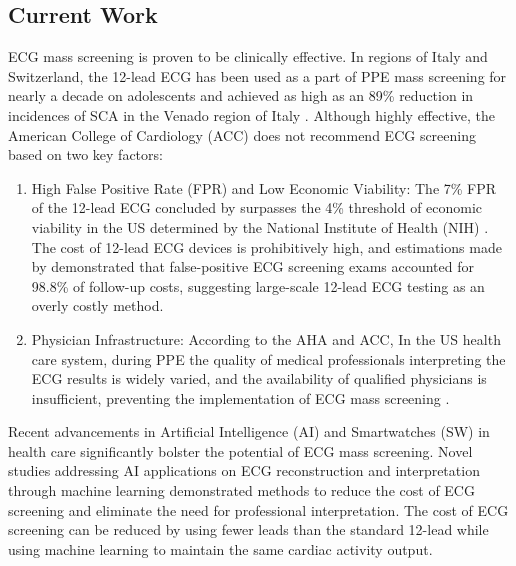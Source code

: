 \documentclass[
	a4paper, 
	10pt, 
	twoside, 
]{LTJournalArticle}
\begin{document}
\subsection{Current Work}
ECG mass screening is proven to be clinically effective. In regions of Italy and Switzerland, the 12-lead ECG has been used as a part of PPE mass screening for nearly a decade on adolescents and achieved as high as an 89\% reduction in incidences of SCA in the Venado region of Italy \cite{Albiski2022}. Although highly effective, the American College of Cardiology (ACC) does not recommend ECG screening based on two key factors:
\begin{enumerate}
    \item High False Positive Rate (FPR) and Low Economic Viability: The 7\% FPR of the 12-lead ECG concluded by \textcite{Harmon2015} surpasses the 4\% threshold of economic viability in the US determined by the National Institute of Health (NIH) \cite{Wheeler2010}. The cost of 12-lead ECG devices is prohibitively high, and estimations made by \textcite{OConnor2010} demonstrated that false-positive ECG screening exams accounted for 98.8\% of follow-up costs, suggesting large-scale 12-lead ECG testing as an overly costly method.
	\item Physician Infrastructure: According to the AHA and ACC, In the US health care system, during PPE the quality of medical professionals interpreting the ECG results is widely varied, and the availability of qualified physicians is insufficient, preventing the implementation of ECG mass screening \cite{Maron2014}.
\end{enumerate}
Recent advancements in Artificial Intelligence (AI) and Smartwatches (SW) in health care significantly bolster the potential of ECG mass screening. Novel studies addressing AI applications on ECG reconstruction and interpretation through machine learning demonstrated methods to reduce the cost of ECG screening and eliminate the need for professional interpretation. The cost of ECG screening can be reduced by using fewer leads than the standard 12-lead while using machine learning to maintain the same cardiac activity output. 
\end{document}
